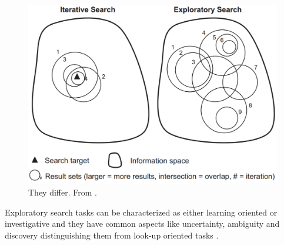 \begin{figure}[htp] %
\caption{They differ. From \protect\cite{white09}.}
\label{figure_IterativeVsExploratory}
\centering
\includegraphics[scale=0.25]{figures/IterativeSearch_vs_ExploratorySearch.pdf}
\end{figure}

Exploratory search tasks can be characterized as either learning oriented or investigative  and they have common aspects like uncertainty, ambiguity and discovery distinguishing them from look-up oriented tasks \cite{kules09}.

